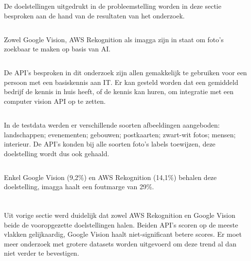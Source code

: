 De doelstellingen uitgedrukt in de probleemstelling worden in deze sectie besproken aan de hand van de resultaten van het onderzoek.

\subsection{}
\label{sec:resultaten-doelstelling1}
Zowel Google Vision, AWS Rekognition als imagga zijn in staat om foto's zoekbaar te maken op basis van AI.

\subsection{}
\label{sec:resultaten-doelstelling2}
De API's besproken in dit onderzoek zijn allen gemakkelijk te gebruiken voor een persoon met een basiskennis aan IT. Er kan gesteld worden dat een gemiddeld bedrijf de kennis in huis heeft, of de kennis kan huren, om integratie met een computer vision API op te zetten.

\subsection{}
\label{sec:resultaten-doelstelling3}
In de testdata werden er verschillende soorten afbeeldingen aangeboden: landschappen; evenementen; gebouwen; postkaarten; zwart-wit fotos; mensen; interieur. De API's konden bij alle soorten foto's labels toewijzen, deze doelstelling wordt dus ook gehaald.

\subsection{}
\label{sec:resultaten-doelstelling4}
Enkel Google Vision (9,2\%) en AWS Rekognition (14,1\%) behalen deze doelstelling, imagga haalt een foutmarge van 29\%. 

\section{}
\label{sec:resultaten-besluit}
Uit vorige sectie werd duidelijk dat zowel AWS Rekognition en Google Vision beide de vooropgezette doelstellingen halen. Beiden API's scoren op de meeste vlakken gelijkaardig, Google Vision haalt niet-significant betere scores. Er moet meer onderzoek met grotere datasets worden uitgevoerd om deze trend al dan niet verder te bevestigen.

